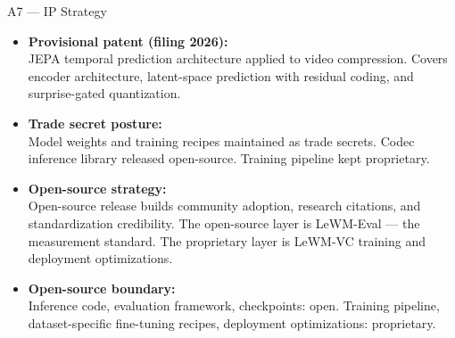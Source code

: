 \documentclass[aspectratio=169, professionalfonts, 10pt]{beamer}
\begin{document}
\begin{frame}{A7 --- IP Strategy}

  \begin{itemize}
    \item \textbf{Provisional patent (filing 2026):} \\
          JEPA temporal prediction architecture applied to
          video compression. Covers encoder architecture,
          latent-space prediction with residual coding,
          and surprise-gated quantization.

    \bigskip
    \item \textbf{Trade secret posture:} \\
          Model weights and training recipes maintained as
          trade secrets. Codec inference library released
          open-source. Training pipeline kept proprietary.

    \bigskip
    \item \textbf{Open-source strategy:} \\
          Open-source release builds community adoption,
          research citations, and standardization credibility.
          The open-source layer is LeWM-Eval --- the measurement
          standard. The proprietary layer is LeWM-VC training
          and deployment optimizations.

    \bigskip
    \item \textbf{Open-source boundary:} \\
          Inference code, evaluation framework, checkpoints:
          open. Training pipeline, dataset-specific fine-tuning
          recipes, deployment optimizations: proprietary.
  \end{itemize}
\end{frame}
\end{document}
